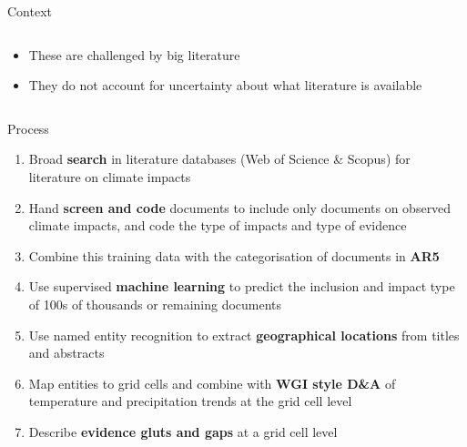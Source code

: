 \documentclass[9pt]{beamer}
\begin{document}
\begin{frame}{Context}
\begin{columns}
\begin{column}{0.312\linewidth}
		\begin{itemize}
			\small
			\item<2->These are challenged by big literature \cite{Callaghan2020} 
			\item<3->They do not account for uncertainty about what literature is available
		\end{itemize}
	\end{column}
\end{columns}

\end{frame}

%
%	
%
%
%


\begin{frame}{Process}

\begin{enumerate}
	\item Broad \textbf{search} in literature databases (Web of Science \& Scopus) for literature on climate impacts
	\item Hand \textbf{screen and code} documents to include only documents on observed climate impacts, and code the type of impacts and type of evidence
	\item Combine this training data with the categorisation of documents in \textbf{AR5}
	\item Use supervised \textbf{machine learning} to predict the inclusion and impact type of 100s of thousands or remaining documents
	\item Use named entity recognition to extract \textbf{geographical locations} from titles and abstracts
	\item Map entities to grid cells and combine with \textbf{WGI style D\&A} of temperature and precipitation trends at the grid cell level
	\item Describe \textbf{evidence gluts and gaps} at a grid cell level
	
\end{enumerate}

\end{frame}
\end{document}
